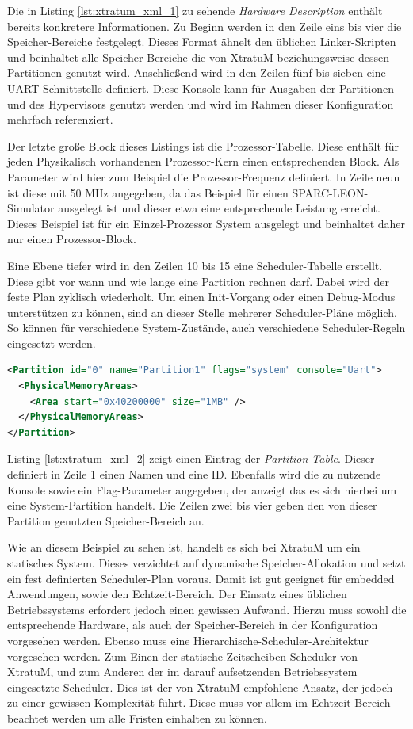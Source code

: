 \documentclass[
  a4paper,					    %
  twoside,
  DIV=calc,     				%
  bibliography=totoc,
  cleardoublepage=empty,
  ngerman,     					%
  final       					%
]{scrbook}
\begin{document}
Die in Listing \ref{lst:xtratum_xml_1} zu sehende \emph{Hardware Description} enthält bereits konkretere Informationen. Zu Beginn werden in den Zeile eins bis vier die Speicher-Bereiche festgelegt. Dieses Format ähnelt den üblichen Linker-Skripten und beinhaltet alle Speicher-Bereiche die von XtratuM beziehungsweise dessen Partitionen genutzt wird. Anschließend wird in den Zeilen fünf bis sieben eine UART-Schnittstelle definiert. Diese Konsole kann für Ausgaben der Partitionen und des Hypervisors genutzt werden und wird im Rahmen dieser Konfiguration mehrfach referenziert.

Der letzte große Block dieses Listings ist die Prozessor-Tabelle. Diese enthält für jeden Physikalisch vorhandenen Prozessor-Kern einen entsprechenden Block. Als Parameter wird hier zum Beispiel die Prozessor-Frequenz definiert. In Zeile neun ist diese mit 50 MHz angegeben, da das Beispiel für einen SPARC-LEON-Simulator ausgelegt ist und dieser etwa eine entsprechende Leistung erreicht. Dieses Beispiel ist für ein Einzel-Prozessor System ausgelegt und beinhaltet daher nur einen Prozessor-Block.

Eine Ebene tiefer wird in den Zeilen 10 bis 15 eine Scheduler-Tabelle erstellt. Diese gibt vor wann und wie lange eine Partition rechnen darf. Dabei wird der feste Plan zyklisch wiederholt. Um einen Init-Vorgang oder einen Debug-Modus unterstützen zu können, sind an dieser Stelle mehrerer Scheduler-Pläne möglich. So können für verschiedene System-Zustände, auch verschiedene Scheduler-Regeln eingesetzt werden.

\begin{lstlisting}[frame=single, language=XML, basicstyle=\footnotesize, caption={XtratuM Partition Table}, label={lst:xtratum_xml_2}]
<Partition id="0" name="Partition1" flags="system" console="Uart">
  <PhysicalMemoryAreas>
    <Area start="0x40200000" size="1MB" />
  </PhysicalMemoryAreas>
</Partition>
\end{lstlisting}

Listing \ref{lst:xtratum_xml_2} zeigt einen Eintrag der \emph{Partition Table}. Dieser definiert in Zeile 1 einen Namen und eine ID. Ebenfalls wird die zu nutzende Konsole sowie ein Flag-Parameter angegeben, der anzeigt das es sich hierbei um eine System-Partition handelt. Die Zeilen zwei bis vier geben den von dieser Partition genutzten Speicher-Bereich an.

Wie an diesem Beispiel zu sehen ist, handelt es sich bei XtratuM um ein statisches System. Dieses verzichtet auf dynamische Speicher-Allokation und setzt ein fest definierten Scheduler-Plan voraus. Damit ist gut geeignet für embedded Anwendungen, sowie den Echtzeit-Bereich. Der Einsatz eines üblichen Betriebssystems erfordert jedoch einen gewissen Aufwand. Hierzu muss sowohl die entsprechende Hardware, als auch der Speicher-Bereich in der Konfiguration vorgesehen werden. Ebenso muss eine Hierarchische-Scheduler-Architektur vorgesehen werden. Zum Einen der statische Zeitscheiben-Scheduler von XtratuM, und zum Anderen der im darauf aufsetzenden Betriebssystem eingesetzte Scheduler. Dies ist der von XtratuM empfohlene Ansatz, der jedoch zu einer gewissen Komplexität führt. Diese muss vor allem im Echtzeit-Bereich beachtet werden um alle Fristen einhalten zu können.\cite{two_lvl_sched}
\end{document}
